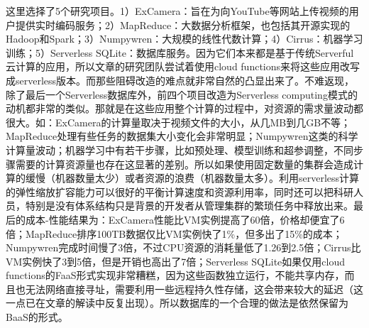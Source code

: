\documentclass[11pt]{article}
\begin{document}
这里选择了5个研究项目。1）ExCamera：旨在为向YouTube等网站上传视频的用户提供实时编码服务；2）MapReduce：大数据分析框架，也包括其开源实现的Hadoop和Spark\cite{jonas2019cloud}；3）Numpywren：大规模的线性代数计算；4）Cirrus：机器学习训练；5）Serverless SQLite：数据库服务。因为它们本来都是基于传统Serverful云计算的应用，所以文章的研究团队尝试着使用cloud functions来将这些应用改写成serverless版本。而那些阻碍改造的难点就非常自然的凸显出来了。不难返现，除了最后一个Serverless数据库外，前四个项目改造为Serverless computing模式的动机都非常的类似。那就是在这些应用整个计算的过程中，对资源的需求量波动都很大。如：ExCamera的计算量取决于视频文件的大小，从几MB到几GB不等；MapReduce处理有些任务的数据集大小变化会非常明显；Numpywren这类的科学计算量波动；机器学习中有若干步骤，比如预处理、模型训练和超参调整，不同步骤需要的计算资源量也存在这显著的差别。所以如果使用固定数量的集群会造成计算的缓慢（机器数量太少）或者资源的浪费（机器数量太多）。利用serverless计算的弹性缩放扩容能力可以很好的平衡计算速度和资源利用率，同时还可以把科研人员，特别是没有体系结构只是背景的开发者从管理集群的繁琐任务中释放出来。最后的成本-性能结果为：ExCamera性能比VM实例提高了60倍，价格却便宜了6倍；MapReduce排序100TB数据仅比VM实例快了1\%，但多出了15\%的成本；Numpywren完成时间慢了3倍，不过CPU资源的消耗量低了1.26到2.5倍；Cirrus比VM实例快了3到5倍，但是开销也高出了7倍；Serverless SQLite如果仅用cloud functions的FaaS形式实现非常糟糕，因为这些函数独立运行，不能共享内存，而且也无法网络直接寻址，需要利用一些远程持久性存储，这会带来较大的延迟（这一点已在文章\cite{hellerstein2018serverless}的解读中反复出现）。所以数据库的一个合理的做法是依然保留为BaaS的形式。
\end{document}
